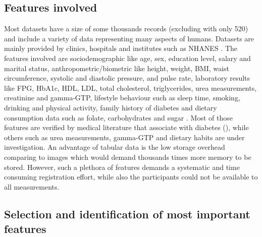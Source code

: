 \documentclass[journal,article,submit,pdftex,moreauthors]{Definitions/mdpi}
\begin{document}
\subsection{Features involved}
Most datasets have a size of some thousands records (excluding \cite{Dritsas} with only 520) and include a variety of data representing
many aspects of humans. Datasets are mainly provided by clinics, hospitals and institutes such as NHANES \cite{Qin,Zou,DeSilva}.
The features involved are sociodemographic like age, sex, education level, salary and marital status, anthropometric/biometric like 
height, weight, BMI, waist circumference, systolic and diastolic pressure, and pulse rate, laboratory results like FPG, HbA1c, HDL,
LDL, total cholesterol, triglycerides, urea measurements, creatinine and gamma-GTP, lifestyle behaviour such as sleep time, smoking,
drinking and physical activity, family history of diabetes and dietary consumption data such as folate, carbohydrates and sugar
\cite{Qin,DeSilva}.
Most of those features are verified by medical literature that associate with diabetes (\cite{idf}), while others such as urea measurements,
gamma-GTP and dietary habits are under investigation. An advantage of tabular data is the low storage overhead comparing to images
which would demand thousands times more memory to be stored. However, such a plethora of features demands a systematic and time 
consuming registration effort, while also the participants could not be available to all measurements.

\subsection{Selection and identification of most important features}
\end{document}
